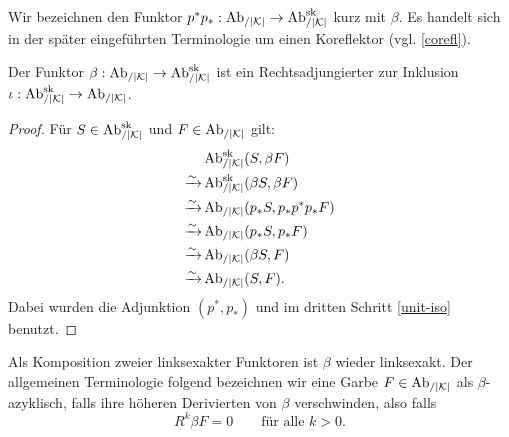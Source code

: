 Wir bezeichnen den Funktor $p^*p_*: \AbKr \to \AbKrsk$ kurz mit
$\beta$. Es handelt sich in der später eingeführten Terminologie um
einen Koreflektor (vgl. \ref{corefl}).
\begin{prop} \label{beta-adjoint}
  Der Funktor $\beta: \AbKr \to \AbKrsk$ ist ein Rechtsadjungierter
  zur Inklusion $\iota: \AbKrsk \to \AbKr$.
\end{prop}
\begin{proof}
  Für $S \in \AbKrsk$ und $F \in \AbKr$ gilt:
  \begin{align*}
    & \AbKrsk(S, \beta F) \\
    \iso & \AbKrsk(\beta S, \beta F) \\
    \iso & \AbKr(p_* S, p_* p^* p_* F) \\
    \iso & \AbKr(p_* S, p_* F) \\
    \iso & \AbKr(\beta S, F) \\
    \iso & \AbKr(S, F).
  \end{align*}
  Dabei wurden die Adjunktion $(p^*, p_*)$ und im dritten Schritt
  \ref{unit-iso} benutzt.
\end{proof}

Als Komposition zweier linksexakter Funktoren ist $\beta$ wieder
linksexakt. Der allgemeinen Terminologie folgend bezeichnen wir eine
Garbe $F \in \AbKr$ als $\beta$-azyklisch, falls ihre höheren
Derivierten von $\beta$ verschwinden, also falls
\[ R^k\beta F = 0 \qquad \text{für alle } k > 0.  \]

